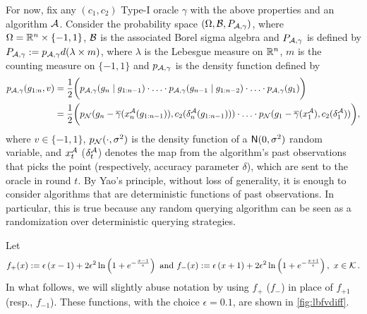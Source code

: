 For now, fix any $(c_1,c_2)$ Type-I oracle $\gamma$ with the above properties and an algorithm $\mathcal{A}$.
Consider the probability space $(\Omega, \mathcal{B}, P_{\mathcal{A},\gamma})$, 
where $\Omega = \mathbb{R}^n\times \{-1,1\}$, $\mathcal{B}$ is the associated Borel sigma algebra
and $P_{\mathcal{A},\gamma}$ is defined by $P_{\mathcal{A},\gamma} := p_{\mathcal{A},\gamma} d(\lambda \times m)$, 
where
	$\lambda$ is the Lebesgue measure on $\mathbb{R}^n$, 
	$m$ is the counting measure on $\{-1,1\}$ and 
	$p_{\mathcal{A},\gamma}$ is the density function defined by
\begin{align*}
p_{\mathcal{A},\gamma}(g_{1:n}, v) 
&= \dfrac{1}{2} \bigg(p_{\mathcal{A},\gamma}(g_n \mid g_{1:n-1})
		\cdot \ldots \cdot p_{\mathcal{A},\gamma }(g_{n-1} \mid g_{1:n-2}) \cdot \ldots \cdot p_{\mathcal{A},\gamma}(g_1)\bigg)\\
&=  \dfrac{1}{2} \bigg( p_{\mathcal{N}}(g_n - \overline{\gamma}(x_n^{\mathcal{A}}(g_{1:n-1})),c_2(\delta_n^{\mathcal{A}}(g_{1:n-1}))) \cdot
									 \ldots \cdot  p_{\mathcal{N}}(g_1 - \overline{\gamma}(x_1^{\mathcal{A}}),c_2(\delta_1^{\mathcal{A}}))\bigg),
\end{align*}
where $v\in\{-1,1\}$, $p_{\mathcal{N}}(\cdot,\sigma^2)$ is the density function of a $\mathsf{N}(0,\sigma^2)$ random variable,
and $x_t^{\mathcal{A}}$ ($\delta_t^{\mathcal{A}}$) denotes the map from the algorithm's past observations
that picks the point (respectively, accuracy parameter $\delta$), which are sent to the oracle in round $t$.
By Yao's principle, without loss of generality, 
it is enough to consider algorithms that are deterministic functions of past observations.
In particular, this is true because any random querying algorithm can be seen as a randomization over deterministic querying strategies. 


Let
\begin{align*}
f_+(x) :=  \epsilon\left( x-1\right)+2\epsilon^2 \ln\left(1+e^{-\frac{x-1}{\epsilon}}  \right)
\text{ and } f_-(x) := \epsilon\left( x+1\right)+2\epsilon^2 \ln\left(1+e^{-\frac{x+1}{\epsilon}}  \right), \,\, x \in \mathcal{K}\,.
\end{align*}
In what follows, we will slightly abuse notation by using $f_+$ ($f_-$) in place of $f_{+1}$ (resp., $f_{-1}$).
These functions, with the choice $\epsilon=0.1$, are shown in \cref{fig:lbfvdiff}.

